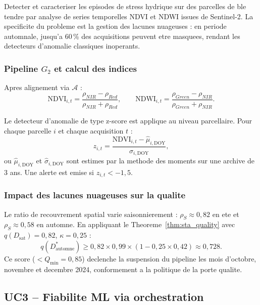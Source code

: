 \documentclass[12pt,a4paper]{article}
\theoremstyle{plain}
\theoremstyle{definition}
\theoremstyle{remark}
\begin{document}
Detecter et caracteriser les episodes de stress hydrique sur des
parcelles de ble tendre par analyse de series temporelles NDVI et NDWI
issues de Sentinel-2. La specificite du probleme est la gestion des
lacunes nuageuses : en periode automnale, jusqu'a 60\,\% des acquisitions
peuvent etre masquees, rendant les detecteurs d'anomalie classiques
inoperants.

\subsubsection{Pipeline $G_2$ et calcul des indices}

Apres alignement via $\mathcal{A}$ :
\begin{equation}
\text{NDVI}_{i,t} = \frac{\rho_{NIR} - \rho_{Red}}{\rho_{NIR} + \rho_{Red}},
\qquad
\text{NDWI}_{i,t} = \frac{\rho_{Green} - \rho_{NIR}}{\rho_{Green} + \rho_{NIR}}.
\label{eq:indices}
\end{equation}

Le detecteur d'anomalie de type z-score est applique au niveau parcellaire.
Pour chaque parcelle $i$ et chaque acquisition $t$ :
\begin{equation}
z_{i,t} = \frac{\text{NDVI}_{i,t} - \hat\mu_{i,\text{DOY}}}
               {\hat\sigma_{i,\text{DOY}}},
\label{eq:zscore}
\end{equation}
ou $\hat\mu_{i,\text{DOY}}$ et $\hat\sigma_{i,\text{DOY}}$ sont estimes
par la methode des moments sur une archive de 3 ans. Une alerte est
emise si $z_{i,t} < -1{,}5$.

\subsubsection{Impact des lacunes nuageuses sur la qualite}

Le ratio de recouvrement spatial varie saisonnierement :
$\rho_S \approx 0{,}82$ en ete et $\rho_S \approx 0{,}58$ en automne.
En appliquant le Theoreme~\ref{thm:sta_quality} avec
$q(D_{\text{sat}}) = 0{,}82$, $\kappa=0{,}25$ :
\begin{equation}
q(D^*_{\text{automne}}) \geq 0{,}82 \times 0{,}99 \times
(1 - 0{,}25 \times 0{,}42) \approx 0{,}728.
\label{eq:uc2_qual}
\end{equation}
Ce score ($<Q_{\min}=0{,}85$) declenche la suspension du pipeline les
mois d'octobre, novembre et decembre 2024, conformement a la politique
de la porte qualite.

\subsection{UC3 -- Fiabilite ML via orchestration}
\label{subsec:uc3}
\end{document}
